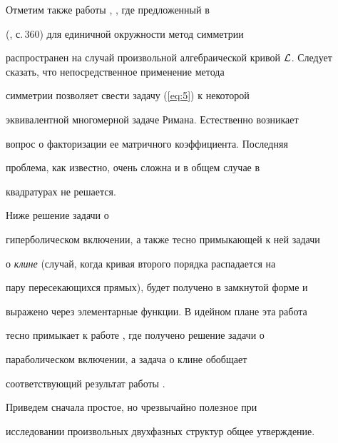 Отметим также работы \cite{ChS}, \cite{Lam}, где предложенный в


(\cite{PK}, с.\,360) для единичной окружности метод симметрии


распространен на случай произвольной алгебраической кривой ${\cal


L}$. Следует сказать, что непосредственное применение метода


симметрии позволяет свести задачу (\ref{eq:5}) к некоторой


эквивалентной многомерной задаче Римана. Естественно возникает


вопрос о факторизации ее матричного коэффициента. Последняя


проблема, как известно, очень сложна и в общем случае в


квадратурах не решается.





Ниже решение задачи о


гиперболическом включении, а также тесно примыкающей к ней задачи


о {\it клине} (случай, когда кривая второго порядка распадается на


пару пересекающихся прямых), будет получено в замкнутой форме и


выражено через элементарные функции. В идейном плане эта работа


тесно примыкает к работе \cite{KO}, где получено решение задачи о


параболическом включении, а задача о клине обобщает


соответствующий результат работы \cite{O96}.





Приведем сначала простое, но чрезвычайно полезное при


исследовании произвольных двухфазных структур общее утверждение.





